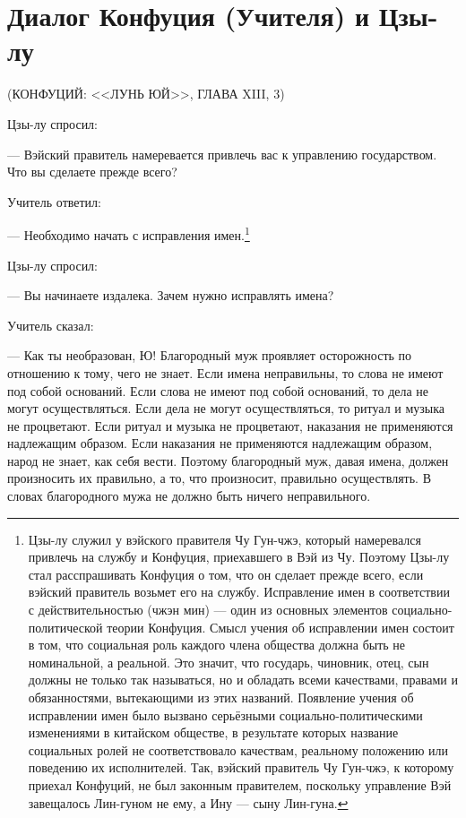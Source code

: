 \chapter*{Диалог Конфуция (Учителя) и Цзы-лу}
\begin{flushright}
\normalsize(КОНФУЦИЙ: <<ЛУНЬ ЮЙ>>, ГЛАВА XIII, 3) 
\end{flushright} 

Цзы-лу спросил: 

— Вэйский правитель намеревается привлечь вас к управлению государством. Что вы
сделаете прежде всего? 

Учитель ответил:

— Необходимо начать с исправления имен.\footnote{%
Цзы-лу служил у вэйского правителя Чу Гун-чжэ, который намеревался привлечь на службу и Конфуция, приехавшего в Вэй из Чу. Поэтому Цзы-лу стал расспрашивать Конфуция о том, что он сделает прежде всего, если вэйский правитель возьмет его на службу. Исправление имен в соответствии с действительностью (чжэн мин) — один из основных элементов социально-политической теории Конфуция. Смысл учения об исправлении имен состоит в том, что социальная роль каждого члена общества должна быть не номинальной, а реальной. Это значит, что государь, чиновник, отец, сын должны не только так называться, но и обладать всеми качествами, правами и обязанностями, вытекающими из этих названий. Появление учения об исправлении имен было вызвано серьёзными социально-политическими изменениями в китайском обществе, в результате которых название социальных ролей не соответствовало качествам, реальному положению или поведению их исполнителей. Так, вэйский правитель Чу Гун-чжэ, к которому приехал Конфуций, не был законным правителем, поскольку управление Вэй завещалось Лин-гуном не ему, а Ину — сыну Лин-гуна.}

Цзы-лу спросил:

— Вы начинаете издалека. Зачем нужно исправлять имена?

Учитель сказал:

— Как ты необразован, Ю! Благородный муж проявляет осторожность по отношению к тому, чего не знает. Если имена неправильны, то слова не имеют под собой оснований. Если слова не имеют под собой оснований, то дела не могут осуществляться. Если дела не могут осуществляться, то ритуал и музыка не процветают. Если ритуал и музыка не процветают, наказания не применяются надлежащим образом. Если наказания не применяются надлежащим образом, народ не знает, как себя вести. Поэтому благородный муж, давая имена, должен произносить их правильно, а то, что произносит, правильно осуществлять. В словах благородного мужа не должно быть ничего неправильного.
